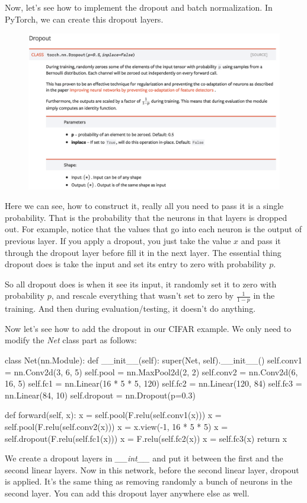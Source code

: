 Now, let's see how to implement the dropout and batch normalization.
In PyTorch, we can create this dropout layers.
\begin{figure}
\centering
\includegraphics[scale=0.4]{./figures/497Proj_dropout}
\end{figure}
Here we can see, how to construct it, really all you need to pass it is a single probability. That is the probability that the neurons in that layers is dropped out. For example, notice that the values that go into each neuron is the output of previous layer. If you apply a dropout, you just take the value $x$ and pass it through the dropout layer before fill it in the next layer. 
The essential thing dropout does is take the input and set its entry to zero with probability $p$.

So all dropout does is when it see its input, it randomly set it to zero with probability $p$, and rescale everything that wasn't set to zero by $\frac{1}{1-p}$ in the training.
And then during evaluation/testing, it doesn't do anything. 

Now let's see how to add the dropout in our CIFAR example. We only need to modify the \emph{Net} class part as follows:
\begin{python}
class Net(nn.Module):
    def __init__(self):
        super(Net, self).__init__()
        self.conv1 = nn.Conv2d(3, 6, 5)
        self.pool = nn.MaxPool2d(2, 2)
        self.conv2 = nn.Conv2d(6, 16, 5)
        self.fc1 = nn.Linear(16 * 5 * 5, 120)
        self.fc2 = nn.Linear(120, 84)
        self.fc3 = nn.Linear(84, 10)
        self.dropout = nn.Dropout(p=0.3)

    def forward(self, x):
        x = self.pool(F.relu(self.conv1(x)))
        x = self.pool(F.relu(self.conv2(x)))
        x = x.view(-1, 16 * 5 * 5)
        x = self.dropout(F.relu(self.fc1(x)))
        x = F.relu(self.fc2(x))
        x = self.fc3(x)
        return x
\end{python}
We create a dropout layers in \emph{\_\_int\_\_} and put it between the first and the second linear layers. Now in this network, before the second linear layer, dropout is applied. It's the same thing as removing  randomly a bunch of neurons in the second layer. You can add this dropout layer anywhere else as well.


